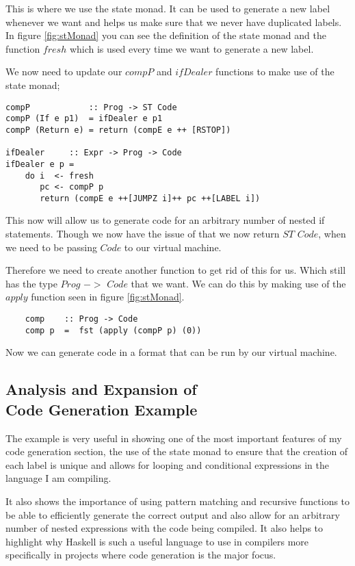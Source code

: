 This is where we use the state monad. It can be used to generate a new label whenever we want and helps us make sure that we never have duplicated labels. In figure \ref{fig:stMonad} you can see the definition of the state monad and the function $fresh$ which is used every time we want to generate a new label. 

We now need to update our $compP$ and $ifDealer$ functions to make use of the state monad;

\begin{lstlisting}
compP            :: Prog -> ST Code 
compP (If e p1)  = ifDealer e p1  
compP (Return e) = return (compE e ++ [RSTOP])
	
ifDealer     :: Expr -> Prog -> Code 
ifDealer e p = 
	do i  <- fresh
	   pc <- compP p
	   return (compE e ++[JUMPZ i]++ pc ++[LABEL i])
\end{lstlisting}

This now will allow us to generate code for an arbitrary number of nested if statements. Though we now have the issue of that we now return $ST$ $Code$, when we need to be passing $Code$ to our virtual machine. 

Therefore we need to create another function to get rid of this for us. Which still has the type $Prog$ $->$ $Code$ that we want. We can do this by making use of the $apply$ function seen in figure \ref{fig:stMonad}.

\begin{lstlisting}
	comp    :: Prog -> Code
	comp p  =  fst (apply (compP p) (0))
\end{lstlisting}    

Now we can generate code in a format that can be run by our virtual machine.

\subsection[Analysis and Expansion of Code Generation Example]{Analysis and Expansion of \\ Code Generation Example}

The example is very useful in showing one of the most important features of my code generation section, the use of the state monad to ensure that the creation of each label is unique and allows for looping and conditional expressions in the language I am compiling.

It also shows the importance of using pattern matching and recursive functions to be able to efficiently generate the correct output and also allow for an arbitrary number of nested expressions with the code being compiled. It also helps to highlight why Haskell is such a useful language to use in compilers more specifically in projects where code generation is the major focus.

